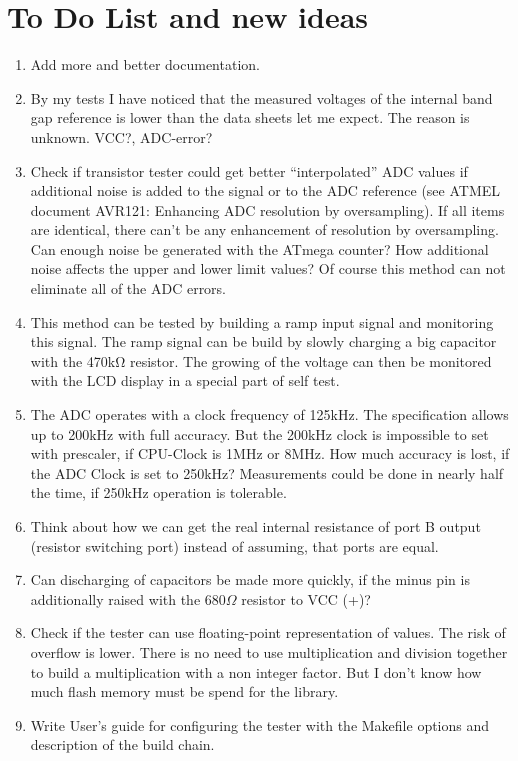 
\chapter{To Do List and new ideas}
\label{sec:todo}

\begin{enumerate}
\item Add more and better documentation.
\item By my tests I have noticed that the measured voltages of the internal band gap reference is lower than the data sheets let me expect. The reason is unknown. VCC?, ADC-error?
\item Check if transistor tester could get better “interpolated” ADC values if additional noise is added to the signal or to the ADC reference (see ATMEL document AVR121: Enhancing ADC resolution by oversampling).
If all items are identical, there can't be any enhancement of resolution by oversampling. Can enough noise be generated with the ATmega counter?
How additional noise affects  the upper and lower limit values?
Of course this method can not eliminate all of the ADC errors. 
\item This method can be tested by building a ramp input signal and monitoring this signal.
The ramp signal can be build by slowly charging a big capacitor with the 470kΩ resistor.
The growing of the voltage can then be monitored with the LCD display in a special part of self test.
\item The ADC operates with a clock frequency of 125kHz. The specification allows up to 200kHz with full accuracy.
But the 200kHz clock is impossible to set with prescaler, if CPU-Clock is 1MHz or 8MHz.
How much accuracy is lost, if the ADC Clock is set to 250kHz?
Measurements could be done in nearly half the time, if 250kHz operation is tolerable.
\item Think about how we can get the real internal resistance of port B output (resistor switching port) instead of assuming, that ports are equal.
\item Can discharging of capacitors be made more quickly, if the minus pin is additionally raised
with the \(680\Omega\) resistor to VCC (+)?
\item Check if the tester can use floating-point representation of  values. The risk of overflow  is lower.
There is no need to use multiplication and division together to build a multiplication with a non integer factor.
But I don't know how much flash memory must be spend for the library.
\item Write User's guide for configuring the tester with the Makefile options and description of the build chain.

\end{enumerate}
